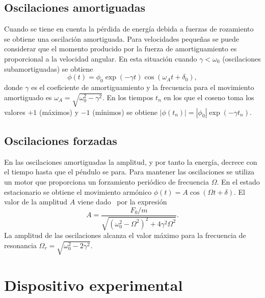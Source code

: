 \documentclass[11pt]{articulo}
\begin{document}
\subsection{Oscilaciones amortiguadas}

Cuando se tiene en cuenta la p\'erdida de energ\'ia debida a fuerzas de rozamiento se obtiene una oscilaci\'on amortiguada. Para velocidades peque\~nas se puede considerar que el momento producido por la fuerza de amortiguamiento es proporcional a la velocidad angular. En esta situaci\'on cuando $\gamma < \omega_0$ (oscilaciones subamortiguadas) se obtiene
%
\begin{equation*}
\phi (t) = \phi_0 \exp(-\gamma t) \cos(\omega_A t + \delta_0),
\end{equation*}
%
donde $\gamma$ es el coeficiente de amortiguamiento y la frecuencia para el movimiento amortiguado es $\omega_A = \sqrt{\omega_0^2 - \gamma^2}$. En los tiempos $t_n$ en los que el coseno toma los valores $+1$ (m\'aximos) y $-1$ (m\'inimos) se obtiene $\left|\phi\left(t_n\right)\right| = \left|\phi_0\right|\exp\left(-\gamma t_n\right)$.

\subsection{Oscilaciones forzadas}

En las oscilaciones amortiguadas la amplitud, y por tanto la energ\'ia, decrece con el tiempo hasta que el p\'endulo se para. Para mantener las oscilaciones se utiliza un motor que proporciona un forzamiento peri\'odico de frecuencia $\Omega$. En el estado estacionario se obtiene el movimiento arm\'onico $\phi(t) = A \cos ( \Omega t + \delta)$. El valor de la amplitud $A$ viene dado~\cite{morin} por la expresi\'on
%
\begin{equation*}
A = \frac{F_0/m}{\sqrt{\left(\omega_0^2 - \Omega^2\right)^2 + 4 \gamma^2\Omega^2}}.
\end{equation*}
%
La amplitud de las oscilaciones alcanza el valor m\'aximo para la frecuencia de resonancia $\Omega_r = \sqrt{\omega_0^2 - 2\gamma^2}$.


\section{Dispositivo experimental}
\end{document}
